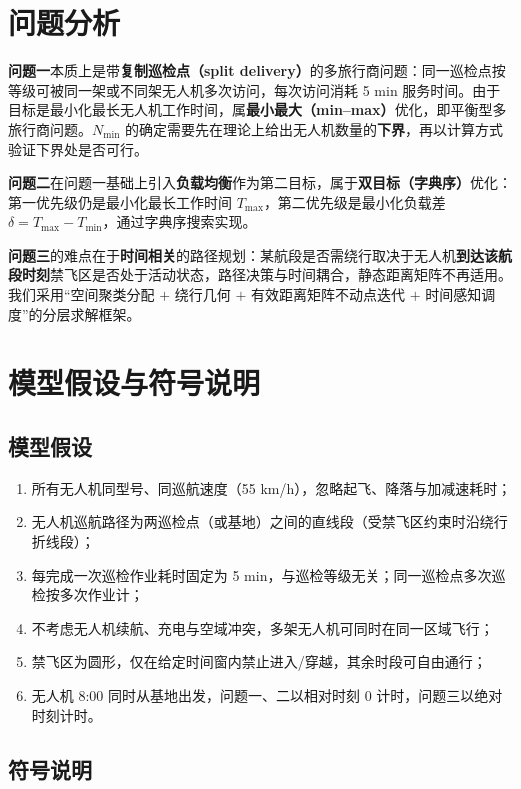 \documentclass[12pt,a4paper]{ctexart}
\begin{document}
\section{问题分析}

\textbf{问题一}本质上是带\textbf{复制巡检点（split delivery）}的多旅行商问题：同一巡检点按等级可被同一架或不同架无人机多次访问，每次访问消耗 5 min 服务时间。由于目标是最小化最长无人机工作时间，属\textbf{最小最大（min--max）}优化，即平衡型多旅行商问题。$N_{\min}$ 的确定需要先在理论上给出无人机数量的\textbf{下界}，再以计算方式验证下界处是否可行。

\textbf{问题二}在问题一基础上引入\textbf{负载均衡}作为第二目标，属于\textbf{双目标（字典序）}优化：第一优先级仍是最小化最长工作时间 $T_{\max}$，第二优先级是最小化负载差 $\delta=T_{\max}-T_{\min}$，通过字典序搜索实现。

\textbf{问题三}的难点在于\textbf{时间相关}的路径规划：某航段是否需绕行取决于无人机\textbf{到达该航段时刻}禁飞区是否处于活动状态，路径决策与时间耦合，静态距离矩阵不再适用。我们采用``空间聚类分配 $+$ 绕行几何 $+$ 有效距离矩阵不动点迭代 $+$ 时间感知调度''的分层求解框架。

\section{模型假设与符号说明}

\subsection{模型假设}

\begin{enumerate}
  \item 所有无人机同型号、同巡航速度（55 km/h），忽略起飞、降落与加减速耗时；
  \item 无人机巡航路径为两巡检点（或基地）之间的直线段（受禁飞区约束时沿绕行折线段）；
  \item 每完成一次巡检作业耗时固定为 5 min，与巡检等级无关；同一巡检点多次巡检按多次作业计；
  \item 不考虑无人机续航、充电与空域冲突，多架无人机可同时在同一区域飞行；
  \item 禁飞区为圆形，仅在给定时间窗内禁止进入/穿越，其余时段可自由通行；
  \item 无人机 8:00 同时从基地出发，问题一、二以相对时刻 0 计时，问题三以绝对时刻计时。
\end{enumerate}

\subsection{符号说明}
\end{document}
